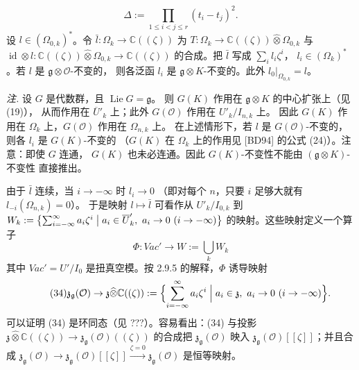 
\[
\Delta:=\prod_{1\le i<j\le r}(t_i-t_j)^2.
\]
设 $l\in(\Omega_{0,k})^*$。令 $\bar{l}:\Omega_k\to\mathbb{C}((\zeta))$ 为
$T:\Omega_k\to\mathbb{C}((\zeta))\widehat{\otimes}\Omega_{0,k}$ 与
$\operatorname{id}\otimes l:\mathbb{C}((\zeta))\widehat{\otimes}\Omega_{0,k}
\to\mathbb{C}((\zeta))$ 的合成。把 $\bar{l}$ 写成 $\sum_i l_i\zeta^i$，
$l_i\in(\Omega_k)^*$。若 $l$ 是 $\mathfrak{g}\otimes\mathcal{O}$-不变的，
则各泛函 $l_i$ 是 $\mathfrak{g}\otimes K$-不变的。此外
$l_0|_{\Omega_{0,k}}=l$。

\emph{注.} 设 $G$ 是代数群，且 $\operatorname{Lie}G=\mathfrak{g}$。
则 $G(K)$ 作用在 $\mathfrak{g}\otimes K$ 的中心扩张上（见 (19)），
从而作用在 $\overline{U}'_k$ 上；此外 $G(\mathcal{O})$ 作用在 $U'_k/I_{n,k}$ 上。
因此 $G(K)$ 作用在 $\Omega_k$ 上，$G(\mathcal{O})$ 作用在 $\Omega_{n,k}$ 上。
在上述情形下，若 $l$ 是 $G(\mathcal{O})$-不变的，则各 $l_i$ 是 $G(K)$-不变的
（$G(K)$ 在 $\Omega_k$ 上的作用见 [BD94] 的公式 (24)）。注意：即使 $G$ 连通，
$G(K)$ 也未必连通。因此 $G(K)$-不变性不能由 $(\mathfrak{g}\otimes K)$-不变性
直接推出。

 由于 $\bar{l}$ 连续，当 $i\to-\infty$ 时 $l_i\to 0$
（即对每个 $n$，只要 $i$ 足够大就有 $l_{-i}(\Omega_{n,k})=0$）。
于是映射 $l\mapsto\bar{l}$ 可看作从 $U'_k/I_{0,k}$ 到
$W_k:=\bigl\{\sum_{i=-\infty}^{\infty}a_i\zeta^i \bigm| a_i\in\overline{U}'_k,\ 
a_i\to 0\ (i\to-\infty)\bigr\}$ 的映射。这些映射定义一个算子
\begin{equation}\tag{33}
\Phi:\mathit{Vac}'\to W:=\bigcup_k W_k
\end{equation}
其中 $\mathit{Vac}'=U'/I_0$ 是扭真空模。按 2.9.5 的解释，$\Phi$ 诱导映射
\begin{equation}\tag{34}
\mathfrak{z}_{\mathfrak{g}}(\mathcal{O})\to
\mathfrak{z}\widehat{\otimes}\mathbb{C}((\zeta))
:=\Bigl\{\sum_{i=-\infty}^{\infty}a_i\zeta^i
\Bigm| a_i\in\mathfrak{z},\ a_i\to 0\ (i\to-\infty)\Bigr\}.
\end{equation}
可以证明 (34) 是环同态（见 ???）。容易看出：(34) 与投影
$\mathfrak{z}\widehat{\otimes}\mathbb{C}((\zeta))
\to\mathfrak{z}_{\mathfrak{g}}(\mathcal{O})((\zeta))$ 的合成把
$\mathfrak{z}_{\mathfrak{g}}(\mathcal{O})$ 映入
$\mathfrak{z}_{\mathfrak{g}}(\mathcal{O})[[\zeta]]$；并且合成
$\mathfrak{z}_{\mathfrak{g}}(\mathcal{O})\to\mathfrak{z}_{\mathfrak{g}}(\mathcal{O})[[\zeta]]
\xrightarrow{\zeta=0}\mathfrak{z}_{\mathfrak{g}}(\mathcal{O})$ 是恒等映射。

